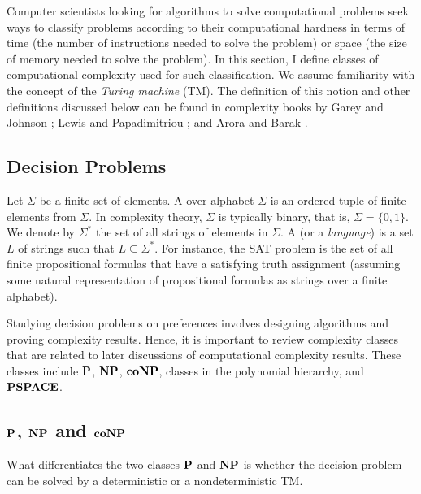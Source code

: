 Computer scientists looking for algorithms to solve computational problems
seek ways to classify problems according to their computational hardness
in terms of time (the number of instructions needed to solve the problem) 
or space (the size of memory needed to solve the problem).
In this section, I define classes of computational
complexity used for such classification.
We assume familiarity with the concept of the \textit{Turing machine} (TM).
The definition of this notion and other definitions discussed 
below can be found in complexity
books by Garey and Johnson \cite{gar-joh:b:int}; Lewis and Papadimitriou
\cite{Lewis:Comput}; and Arora and Barak \cite{Arora:Comput}.



\subsection{Decision Problems}
Let $\Sigma$ be a finite set of elements. A  over alphabet $\Sigma$
is an ordered tuple of finite elements from $\Sigma$. In complexity theory,
$\Sigma$ is typically binary, that is, $\Sigma=\{0,1\}$.
We denote by $\Sigma^*$ the set of all strings of elements in $\Sigma$.
A  (or a \textit{language}) is a set 
$L$ of strings such that $L \subseteq \Sigma^*$.
For instance, the SAT problem is the set of all finite propositional
formulas that have a satisfying truth assignment (assuming some natural
representation of propositional formulas as strings over a finite alphabet).


Studying decision problems on preferences involves designing algorithms and
proving complexity results.  Hence, it is important to review complexity classes
that are related to later discussions of computational complexity results.
These classes include $\textbf{P}$, $\textbf{NP}$, $\textbf{coNP}$, classes in the polynomial
hierarchy, and $\textbf{PSPACE}$.


\subsection{$\textbf{P}$, $\textbf{NP}$ and $\textbf{coNP}$}
What differentiates the two classes $\textbf{P}$ and $\textbf{NP}$ is whether the decision problem
can be solved by a deterministic or a nondeterministic TM. \cite{Arora:Comput}

